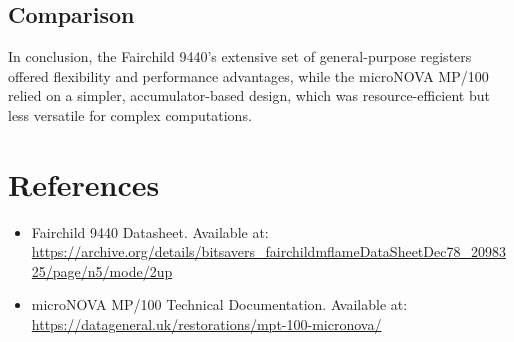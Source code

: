 \documentclass[a4paper,12pt]{article}
\begin{document}
\subsection{Comparison}

\begin{table}[H]
\centering
{}
\caption{Comparison of Fairchild 9440 and microNOVA MP/100 Registers}
\end{table}


In conclusion, the Fairchild 9440's extensive set of general-purpose registers offered flexibility and performance advantages, while the microNOVA MP/100 relied on a simpler, accumulator-based design, which was resource-efficient but less versatile for complex computations.


\section*{References}

\begin{itemize}
    \item Fairchild 9440 Datasheet. Available at: \url{https://archive.org/details/bitsavers_fairchildmflameDataSheetDec78_2098325/page/n5/mode/2up}
    \item microNOVA MP/100 Technical Documentation. Available at: \url{https://datageneral.uk/restorations/mpt-100-micronova/}
\end{itemize}
\end{document}
